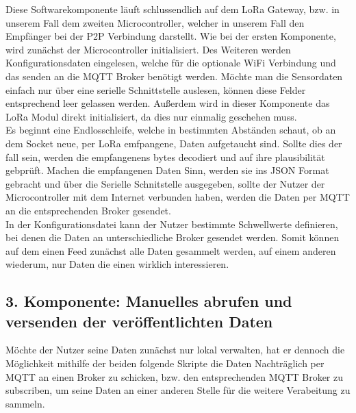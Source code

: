 Diese Softwarekomponente läuft schlussendlich auf dem LoRa Gateway, bzw. in unserem Fall dem zweiten Microcontroller, welcher in unserem Fall den Empfänger bei der P2P Verbindung darstellt.
Wie bei der ersten Komponente, wird zunächst der Microcontroller initialisiert. Des Weiteren werden Konfigurationsdaten eingelesen, welche für die optionale WiFi Verbindung und das senden an die MQTT Broker benötigt werden. Möchte man die Sensordaten einfach nur über eine serielle Schnittstelle auslesen, können diese Felder entsprechend leer gelassen werden.
Außerdem wird in dieser Komponente das LoRa Modul direkt initialisiert, da dies nur einmalig geschehen muss.\\
Es beginnt eine Endlosschleife, welche in bestimmten Abständen schaut, ob an dem Socket neue, per LoRa emfpangene, Daten aufgetaucht sind. Sollte dies der fall sein, werden die empfangenens bytes decodiert und auf ihre plausibilität gebprüft. Machen die empfangenen Daten Sinn, werden sie ins JSON Format gebracht und über die Serielle Schnitstelle ausgegeben, sollte der Nutzer der Microcontroller mit dem Internet verbunden haben, werden die Daten per MQTT an die entsprechenden Broker gesendet.\\
In der Konfigurationsdatei kann der Nutzer bestimmte Schwellwerte definieren, bei denen die Daten an unterschiedliche Broker gesendet werden. Somit können auf dem einen Feed zunächst alle Daten gesammelt werden, auf einem anderen wiederum, nur Daten die einen wirklich interessieren.

\subsection{3. Komponente: Manuelles abrufen und versenden der veröffentlichten Daten} \label{PubSub}

Möchte der Nutzer seine Daten zunächst nur lokal verwalten, hat er dennoch die Möglichkeit mithilfe der beiden folgende Skripte die Daten Nachträglich per MQTT an einen Broker zu schicken, bzw. den entsprechenden MQTT Broker zu subscriben, um seine Daten an einer anderen Stelle für die weitere Verabeitung zu sammeln.\\

